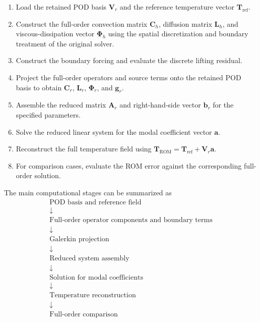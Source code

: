 \begin{enumerate}
    \item Load the retained POD basis
    $\mathbf{V}_r$ and the reference temperature vector
    $\mathbf{T}_{\mathrm{ref}}$.

    \item Construct the full-order convection matrix
    $\mathbf{C}_h$, diffusion matrix $\mathbf{L}_h$,
    and viscous-dissipation vector
    $\boldsymbol{\Phi}_h$ using the spatial discretization
    and boundary treatment of the original solver.

    \item Construct the boundary forcing and evaluate
    the discrete lifting residual.

    \item Project the full-order operators and source
    terms onto the retained POD basis to obtain
    $\mathbf{C}_r$, $\mathbf{L}_r$,
    $\boldsymbol{\Phi}_r$, and $\mathbf{g}_r$.

    \item Assemble the reduced matrix
    $\mathbf{A}_r$ and right-hand-side vector
    $\mathbf{b}_r$ for the specified parameters.

    \item Solve the reduced linear system for the modal
    coefficient vector $\mathbf{a}$.

    \item Reconstruct the full temperature field using
    $\mathbf{T}_{\mathrm{ROM}}=
    \mathbf{T}_{\mathrm{ref}}+\mathbf{V}_r\mathbf{a}$.

    \item For comparison cases, evaluate the ROM error
    against the corresponding full-order solution.
\end{enumerate}

The main computational stages can be summarized as
\[
\boxed{
\begin{gathered}
\text{POD basis and reference field}\\
\downarrow\\
\text{Full-order operator components and boundary terms}\\
\downarrow\\
\text{Galerkin projection}\\
\downarrow\\
\text{Reduced system assembly}\\
\downarrow\\
\text{Solution for modal coefficients}\\
\downarrow\\
\text{Temperature reconstruction}\\
\downarrow\\
\text{Full-order comparison}
\end{gathered}
}
\]

